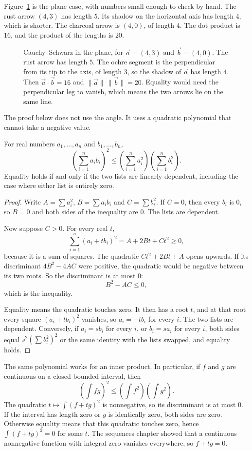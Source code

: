 Figure~\ref{fig:align} is the plane case, with numbers small enough to check by hand. The rust arrow $(4,3)$ has length $5$. Its shadow on the horizontal axis has length $4$, which is shorter. The charcoal arrow is $(4,0)$, of length $4$. The dot product is $16$, and the product of the lengths is $20$.

\begin{figure}[ht]
\centering
{}
\caption{Cauchy--Schwarz in the plane, for $\vec a=(4,3)$ and $\vec b=(4,0)$. The rust arrow has length $5$. The ochre segment is the perpendicular from its tip to the axis, of length $3$, so the shadow of $\vec a$ has length $4$. Then $\vec a\cdot\vec b=16$ and $\|\vec a\|\,\|\vec b\|=20$. Equality would need the perpendicular leg to vanish, which means the two arrows lie on the same line.}
\label{fig:align}
\end{figure}

The proof below does not use the angle. It uses a quadratic polynomial that cannot take a negative value.

\begin{theorem}\label{thm:cs}
For real numbers $a_1,\dots,a_n$ and $b_1,\dots,b_n$,
\[
\left(\sum_{i=1}^na_ib_i\right)^2\le\left(\sum_{i=1}^na_i^2\right)\left(\sum_{i=1}^nb_i^2\right).
\]
Equality holds if and only if the two lists are linearly dependent, including the case where either list is entirely zero.
\end{theorem}
\begin{proof}
Write $A=\sum a_i^2$, $B=\sum a_ib_i$ and $C=\sum b_i^2$. If $C=0$, then every $b_i$ is $0$, so $B=0$ and both sides of the inequality are $0$. The lists are dependent.

Now suppose $C>0$. For every real $t$,
\[
\sum_{i=1}^n(a_i+tb_i)^2=A+2Bt+Ct^2\ge0,
\]
because it is a sum of squares. The quadratic $Ct^2+2Bt+A$ opens upwards. If its discriminant $4B^2-4AC$ were positive, the quadratic would be negative between its two roots. So the discriminant is at most $0$:
\[
B^2-AC\le0,
\]
which is the inequality.

Equality means the quadratic touches zero. It then has a root $t$, and at that root every square $(a_i+tb_i)^2$ vanishes, so $a_i=-tb_i$ for every $i$. The two lists are dependent. Conversely, if $a_i=sb_i$ for every $i$, or $b_i=sa_i$ for every $i$, both sides equal $s^2(\sum b_i^2)^2$ or the same identity with the lists swapped, and equality holds.
\end{proof}

The same polynomial works for an inner product. In particular, if $f$ and $g$ are continuous on a closed bounded interval, then
\[
\left(\int fg\right)^2\le\left(\int f^2\right)\left(\int g^2\right).
\]
The quadratic $t\mapsto\int(f+tg)^2$ is nonnegative, so its discriminant is at most $0$. If the interval has length zero or $g$ is identically zero, both sides are zero. Otherwise equality means that this quadratic touches zero, hence $\int(f+tg)^2=0$ for some $t$. The sequences chapter showed that a continuous nonnegative function with integral zero vanishes everywhere, so $f+tg=0$.

